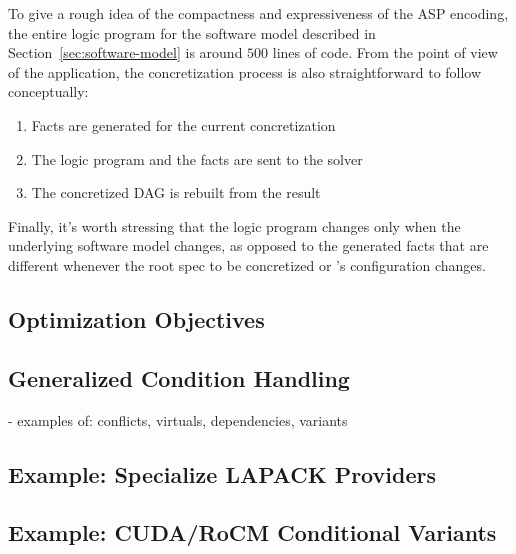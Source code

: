 To give a rough idea of the compactness and expressiveness of 
the ASP encoding, the entire logic program for the software 
model described in Section~\ref{sec:software-model} is around 
$500$ lines of code. From the point of view of the application, 
the concretization process is also straightforward to follow
conceptually:
\begin{enumerate}
\item Facts are generated for the current concretization
\item The logic program and the facts are sent to the solver
\item The concretized DAG is rebuilt from the result
\end{enumerate}
Finally, it's worth stressing that the logic program changes only
when the underlying software model changes, as opposed 
to the generated facts that are different whenever the root
spec to be concretized or \spack's configuration changes.

\subsection{Optimization Objectives}

\subsection{Generalized Condition Handling}
  - examples of: conflicts, virtuals, dependencies, variants

\subsection{Example: Specialize LAPACK Providers}
\subsection{Example: CUDA/RoCM Conditional Variants}
